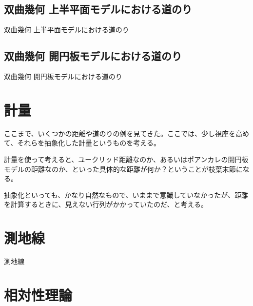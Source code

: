 
\subsection{ 双曲幾何 上半平面モデルにおける道のり }

双曲幾何 上半平面モデルにおける道のり

\newpage


\subsection{ 双曲幾何 開円板モデルにおける道のり }

双曲幾何 開円板モデルにおける道のり

\newpage


\section{ 計量 }

ここまで、いくつかの距離や道のりの例を見てきた。ここでは、少し視座を高めて、それらを抽象化した計量というものを考える。

計量を使って考えると、ユークリッド距離なのか、あるいはポアンカレの開円板モデルの距離なのか、といった具体的な距離が何か？ということが枝葉末節になる。

抽象化といっても、かなり自然なもので、いままで意識していなかったが、距離を計算するときに、見えない行列がかかっていたのだ、と考える。

\newpage


\section{ 測地線 }

測地線

\newpage


\section{ 相対性理論 }


